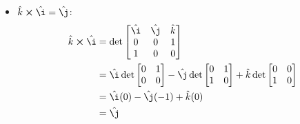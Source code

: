 \documentclass{report}
\newenvironment{answer}
  {\begin{minipage}{\linewidth}}
  {\end{minipage}}
\begin{document}
\begin{answer}
\begin{itemize}
\item $\hat{k} \cross \hat{\i} = \hat{\j}$:
\begin{align*}
\hat{k} \cross \hat{\i} &= \det
\begin{bmatrix}
\hat{\i} & \hat{\j} & \hat{k} \\
0 & 0 & 1 \\
1 & 0 & 0
\end{bmatrix} \\
&= \hat{\i} \det \begin{bmatrix} 0 & 1 \\ 0 & 0 \end{bmatrix}
 - \hat{\j} \det \begin{bmatrix} 0 & 1 \\ 1 & 0 \end{bmatrix}
 + \hat{ k} \det \begin{bmatrix} 0 & 0 \\ 1 & 0 \end{bmatrix} \\
&= \hat{\i} (0) - \hat{\j} (-1) + \hat{k} (0) \\
&= \hat{\j}
\end{align*}
\end{itemize}
\end{answer}
\end{document}
